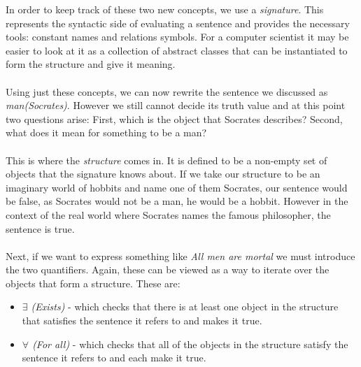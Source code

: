 \documentclass{report}
\begin{document}
\noindent In order to keep track of these two new concepts, we use a \emph{
signature}. This represents the syntactic side of evaluating a sentence and 
provides the necessary tools: constant names and relations symbols. For a 
computer scientist it may be easier to look at it as a collection of abstract 
classes that can be instantiated to form the structure and give it meaning.
\\ \\
Using just these concepts, we can now rewrite the sentence we discussed as 
\emph{man(Socrates)}. However we still cannot decide its truth value and at this
point two questions arise: First, which is the object that Socrates describes?
Second, what does it mean for something to be a man?
\\ \\
This is where the \emph{structure} comes in. It is defined to be a non-empty set
of objects that the signature knows about. If we take our structure to be an
imaginary world of hobbits and name one of them Socrates, our sentence would be
false, as Socrates would not be a man, he would be a hobbit. However in the 
context of the real world where Socrates names the famous philosopher, the 
sentence is true. \\ \\
Next, if we want to express something like \emph{All men are mortal} we must 
introduce the two quantifiers. Again, these can be viewed as a way to iterate 
over the objects that form a structure. These are:

	\begin{itemize}
	\item \emph{$\exists$ (Exists)} 
  - which checks that there is at least one object in the structure that
  satisfies the sentence it refers to and makes it true.
	\item \emph{$\forall$ (For all)}
  - which checks that all of the objects in the structure satisfy the sentence 
  it refers to and each make it true.
	\end{itemize}
\end{document}
